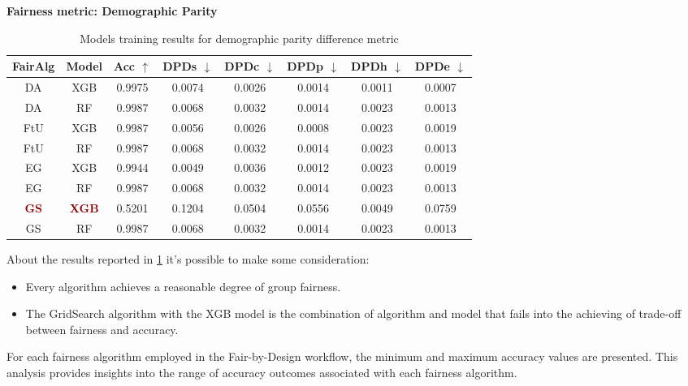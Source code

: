\textbf{Fairness metric: Demographic Parity}

\begin{table}
    \centering
    \begin{tabular}{|c|c|c|c|c|c|c|c|}
        \hline
        \textbf{FairAlg} & \textbf{Model} & \textbf{Acc} $\uparrow$ & \textbf{DPDs} $\downarrow$ & \textbf{DPDc} $\downarrow$ & \textbf{DPDp} $\downarrow$ & \textbf{DPDh} $\downarrow$ & \textbf{DPDe} $\downarrow$ \\
        \hline
        DA & XGB & 0.9975 & 0.0074 & 0.0026 & 0.0014 & 0.0011 & 0.0007\\
        \hline
        DA & RF & 0.9987 & 0.0068 & 0.0032 & 0.0014 & 0.0023 & 0.0013\\
        \hline
        FtU & XGB & 0.9987 & 0.0056 & 0.0026 & 0.0008 & 0.0023 & 0.0019 \\
        \hline
        FtU & RF & 0.9987 & 0.0068 & 0.0032 & 0.0014 & 0.0023 & 0.0013 \\
        \hline
        EG & XGB & 0.9944 & 0.0049 & 0.0036 & 0.0012 & 0.0023 & 0.0019 \\
        \hline
        EG & RF & 0.9987 & 0.0068 & 0.0032 & 0.0014 & 0.0023 & 0.0013 \\
        \hline
        \textcolor{darkred}{\textbf{GS}} & \textcolor{darkred}{\textbf{XGB}} & 0.5201 & 0.1204 & 0.0504 & 0.0556 & 0.0049 & 0.0759 \\
        \hline
        GS & RF & 0.9987 & 0.0068 & 0.0032 & 0.0014 & 0.0023 & 0.0013 \\
        \hline
    \end{tabular}
    \caption{Models training results for demographic parity difference metric}
    \label{tab:results_dpd}
\end{table}

About the results reported in \cref{tab:results_dpd} it's possible to make some consideration:

\begin{itemize}
        \item Every algorithm achieves a reasonable degree of group fairness.

        \item The GridSearch algorithm with the XGB model is the combination of algorithm and model that fails into the achieving of trade-off between fairness and accuracy.

\end{itemize}

For each fairness algorithm employed in the Fair-by-Design workflow, the minimum and maximum accuracy values are presented. This analysis provides insights into the range of accuracy outcomes associated with each fairness algorithm.

